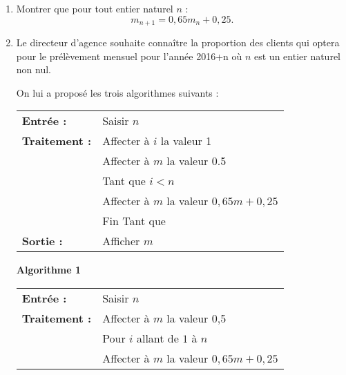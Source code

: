 %
%
\par
\begin{enumerate}
     \item %
     Montrer que pour tout entier naturel $n$ :
     \[ m_{n+1}=0,65m_n + 0,25. \]
     \item %
     Le directeur d'agence souhaite connaître la proportion des clients qui optera pour le prélèvement mensuel pour l'année 2016+n où $n$ est un entier naturel non nul.
     \par
     On lui a proposé les trois algorithmes suivants :
     \par
     \begin{center}
          \begin{extern}%
               \begin{tabular}{|l l|}\hline
                    \textbf{Entrée :}	& 	Saisir $n$\\
                    \textbf{Traitement :}	& Affecter à $i$ la valeur 1 \\
                    & Affecter à $m$ la valeur 0.5\\
                    & Tant que $i < n$\\
                    &\qquad Affecter à $m$ la valeur $0,65m + 0,25$ \\
                    &Fin Tant que\\
                    \textbf{Sortie :}		&Afficher $m$ \\ \hline
               \end{tabular}
          \end{extern}
          \par
          \textbf{Algorithme 1}
     \end{center}
     \begin{center}
          \begin{extern}%
               \begin{tabular}{|l l|}\hline
                    \textbf{Entrée :}	& 	Saisir $n$\\
                    \textbf{Traitement :} & Affecter à $m$ la valeur 0,5\\
                    & Pour $i$ allant de $1$ à $n$\\
                    &\qquad Affecter à $m$ la valeur $0,65m + 0,25$ \\

\end{tabular}
\end{extern}
\end{center}
\end{enumerate}
